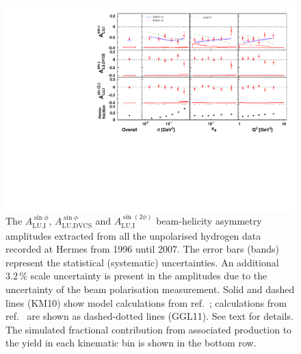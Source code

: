 \documentclass[11pt,a4paper]{article}
\begin{document}
\begin{figure}
 \begin{center}
 \includegraphics[width=15cm]{bsa_comb}
  \caption{The $A_{\textrm{LU,I}}^{\sin\phi}$, $A_{\textrm{LU,DVCS}}^{\sin\phi}$ and
$A_{\textrm{LU,I}}^{\sin(2\phi)}$ beam-helicity asymmetry amplitudes extracted from all the unpolarised hydrogen data recorded at H{\sc ermes}
from 1996 until 2007. The error bars (bands) represent the statistical
(systematic) uncertainties. An additional 3.2\,\% scale uncertainty is present in the amplitudes due to the uncertainty of
the beam polarisation measurement. Solid and dashed lines (KM10) show model calculations from ref.~\cite{Kum09}; calculations from ref.~\cite{Liu11} are shown as dashed-dotted lines (GGL11). See text for details. The simulated fractional contribution from associated production to the yield in each kinematic bin is shown in the bottom row.}
  \label{bsa_xbjrange}
 \end{center}
\end{figure}
\end{document}
